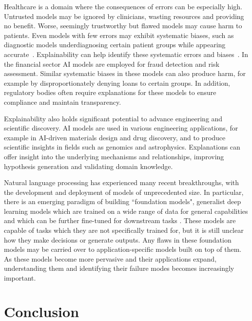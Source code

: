 \documentclass[graybox]{svmult}
\newcommand\todo[1]{\textcolor{red}{TODO: #1}}
\begin{document}
Healthcare is a domain where the consequences of errors can be especially high. Untrusted models may be ignored by clinicians, wasting resources and providing no benefit. Worse, seemingly trustworthy but flawed models may cause harm to patients. Even models with few errors may exhibit systematic biases, such as diagnostic models underdiagnosing certain patient groups while appearing accurate~\cite{seyyed-kalantariUnderdiagnosisBiasArtificial2021}. Explainability can help identify these systematic errors and biases~\cite{arias-duartFocusRatingXAI2022}. In the financial sector AI models are employed for fraud detection and risk assessment. Similar systematic biases in these models can also produce harm, for example by disproportionately denying loans to certain groups. In addition, regulatory bodies often require explanations for these models to ensure compliance and maintain transparency.

Explainability also holds significant potential to advance engineering and scientific discovery. AI models are used in various engineering applications, for example in AI-driven materials design and drug discovery, and to produce scientific insights in fields such as genomics and astrophysics. Explanations can offer insight into the underlying mechanisms and relationships, improving hypothesis generation and validating domain knowledge.

Natural language processing has experienced many recent breakthroughs, with the development and deployment of models of unprecedented size. In particular, there is an emerging paradigm of building ``foundation models", generalist deep learning models which are trained on a wide range of data for general capabilities and which can be further fine-tuned for downstream tasks \cite{bommasaniOpportunitiesRisksFoundation2021}. These models are capable of tasks which they are not specifically trained for, but it is still unclear how they make decisions or generate outputs. Any flaws in these foundation models may be carried over to application-specific models built on top of them. As these models become more pervasive and their applications expand, understanding them and identifying their failure modes becomes increasingly important.





\section{Conclusion}
\label{section:conclusion}
\end{document}
